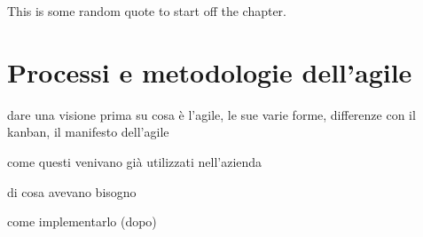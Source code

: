 \begin{savequote}[75mm]
This is some random quote to start off the chapter.
\end{savequote}

\chapter{Processi e metodologie dell'agile}


dare una visione prima su cosa è l'agile, le sue varie forme, differenze con il kanban, il manifesto dell'agile

come questi venivano già utilizzati nell'azienda

di cosa avevano bisogno

come implementarlo (dopo)




